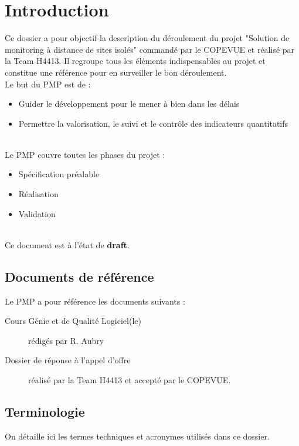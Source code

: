 \section{Introduction}

Ce dossier a pour objectif la description du déroulement du projet
"Solution de monitoring à distance de sites isolés" commandé par le
COPEVUE et réalisé par la Team H4413. Il regroupe tous les éléments
indispensables au projet et constitue une référence pour en surveiller le
bon déroulement.\\

Le but du PMP est de :
\begin{itemize}
\item Guider le développement pour le mener à bien dans les délais
\item Permettre la valorisation, le suivi et le contrôle des indicateurs
quantitatifs
\end{itemize}
\hfill\\

Le PMP couvre toutes les phases du projet :
\begin{itemize}
\item Spécification préalable
\item Réalisation
\item Validation
\end{itemize}

\hfill\\

Ce document est à l'état de \textbf{draft}.

\subsection{Documents de référence}

Le PMP a pour référence les documents suivants :
\begin{description}
\item[Cours Génie et de Qualité Logiciel(le)] rédigés par R. Aubry
\item[Dossier de réponse à l'appel d'offre] réalisé par la Team H4413 et
accepté par le COPEVUE.
\end{description}


\subsection{Terminologie}

On détaille ici les termes techniques et acronymes utilisés dans ce
dossier.

